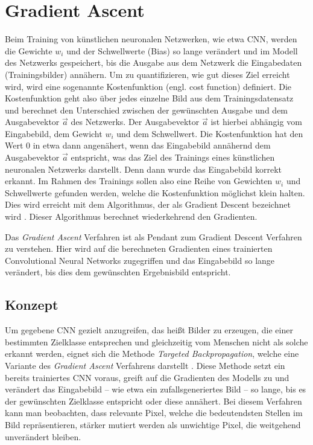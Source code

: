 \chapter{Gradient Ascent}
\label{cha:gascent}

Beim Training von künstlichen neuronalen Netzwerken, wie etwa \ac{CNN}, werden die Gewichte $ w_{i} $ und der Schwellwerte (Bias) so lange verändert und im Modell des Netzwerks gespeichert, bis die Ausgabe aus dem Netzwerk die Eingabedaten (Trainingsbilder) annähern. Um zu quantifizieren, wie gut dieses Ziel erreicht wird, wird eine sogenannte Kostenfunktion (engl. cost function) definiert. 
Die Kostenfunktion geht also über jedes einzelne Bild aus dem Trainingsdatensatz und berechnet den Unterschied zwischen der gewünschten Ausgabe und dem Ausgabevektor $\vec{a}$ des Netzwerks.
Der Ausgabevektor $\vec{a}$ ist hierbei abhängig vom Eingabebild, dem Gewicht $w_{i}$ und dem Schwellwert.
Die Kostenfunktion hat den Wert 0 in etwa dann angenähert, wenn das Eingabebild annähernd dem Ausgabevektor $\vec{a}$ entspricht, was das Ziel des Trainings eines künstlichen neuronalen Netzwerks darstellt. Denn dann wurde das Eingabebild korrekt erkannt.
Im Rahmen des Trainings sollen also eine Reihe von Gewichten $w_{i}$ und Schwellwerte gefunden werden, welche die Kostenfunktion möglichst klein halten. 
Dies wird erreicht mit dem Algorithmus, der als Gradient Descent bezeichnet wird \cite{zhou_understanding_2018}.
Dieser Algorithmus berechnet wiederkehrend den Gradienten. 


Das \textit{Gradient Ascent} Verfahren ist als Pendant zum Gradient Descent Verfahren zu verstehen. Hier wird auf die berechneten Gradienten eines trainierten Convolutional Neural Networks zugegriffen und das Eingabebild so lange verändert, bis dies dem gewünschten Ergebnisbild entspricht.


\section{Konzept}
Um gegebene \ac{CNN} gezielt anzugreifen, das heißt Bilder zu erzeugen, die einer bestimmten Zielklasse entsprechen und gleichzeitig vom Menschen nicht als solche erkannt werden, eignet sich die Methode \textit{Targeted Backpropagation}, welche eine Variante des \textit{Gradient Ascent} Verfahrens darstellt \cite{liu_delving_2016}.
Diese Methode setzt ein bereits trainiertes \ac{CNN} voraus, greift auf die Gradienten des Modells zu und verändert das Eingabebild – wie etwa ein zufallsgeneriertes Bild – so lange, bis es der gewünschten Zielklasse entspricht oder diese annähert. 
Bei diesem Verfahren kann man beobachten, dass relevante Pixel, welche die bedeutendsten Stellen im Bild repräsentieren, stärker mutiert werden als unwichtige Pixel, die weitgehend unverändert bleiben.



